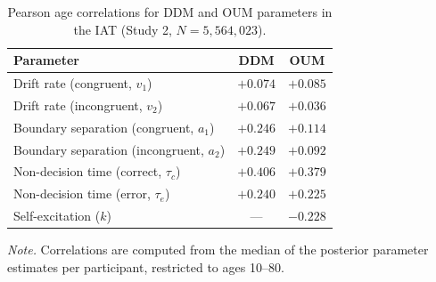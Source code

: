 \begin{table}[ht]
\centering
\caption{Pearson age correlations for DDM and OUM parameters in the IAT (Study 2, $N = 5,564,023$).}
\label{tab:age_correlations}
\begin{tabular}{l cc}
\toprule
Parameter & DDM & OUM \\
\midrule
Drift rate (congruent, $v_1$) & $+0.074$ & $+0.085$ \\
Drift rate (incongruent, $v_2$) & $+0.067$ & $+0.036$ \\
Boundary separation (congruent, $a_1$) & $+0.246$ & $+0.114$ \\
Boundary separation (incongruent, $a_2$) & $+0.249$ & $+0.092$ \\
Non-decision time (correct, $\tau_c$) & $+0.406$ & $+0.379$ \\
Non-decision time (error, $\tau_e$) & $+0.240$ & $+0.225$ \\
\addlinespace
Self-excitation ($k$) & --- & $-0.228$ \\
\bottomrule
\end{tabular}

\smallskip
\noindent\textit{Note.} Correlations are computed from the median of the posterior parameter estimates per participant, restricted to ages 10--80.
\end{table}
